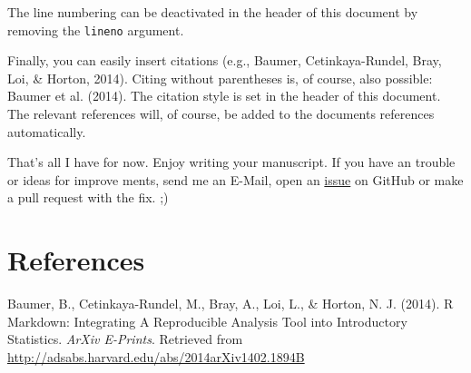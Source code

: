 \documentclass[american,man]{apa6}
\begin{document}
The line numbering can be deactivated in the header of this document by
removing the \texttt{lineno} argument.

Finally, you can easily insert citations (e.g., {Baumer},
{Cetinkaya-Rundel}, {Bray}, {Loi}, \& {Horton}, 2014). Citing without
parentheses is, of course, also possible: {Baumer} et al. (2014). The
citation style is set in the header of this document. The relevant
references will, of course, be added to the documents references
automatically.

That's all I have for now. Enjoy writing your manuscript. If you have an
trouble or ideas for improve ments, send me an E-Mail, open an
\href{https://github.com/crsh/r2apa/issues}{issue} on GitHub or make a
pull request with the fix. ;)

\section{References}\label{references}

{Baumer}, B., {Cetinkaya-Rundel}, M., {Bray}, A., {Loi}, L., \&
{Horton}, N. J. (2014). R Markdown: Integrating A Reproducible Analysis
Tool into Introductory Statistics. \emph{ArXiv E-Prints}. Retrieved from
\url{http://adsabs.harvard.edu/abs/2014arXiv1402.1894B}
\end{document}
